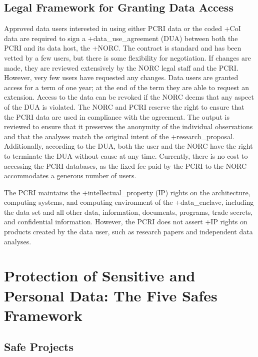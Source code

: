 \documentclass[
]{book}
\begin{document}
\hypertarget{legal-framework-for-granting-data-access-3}{%
\subsection{Legal Framework for Granting Data Access}\label{legal-framework-for-granting-data-access-3}}

Approved data users interested in using either PCRI data or the coded +CoI\textbar{} data are required to sign a +data\_use\_agreement\textbar{} (DUA) between both the PCRI and its data host, the +NORC\textbar. The contract is standard and has been vetted by a few users, but there is some flexibility for negotiation. If changes are made, they are reviewed extensively by the NORC legal staff and the PCRI. However, very few users have requested any changes. Data users are granted access for a term of one year; at the end of the term they are able to request an extension. Access to the data can be revoked if the NORC deems that any aspect of the DUA is violated. The NORC and PCRI reserve the right to ensure that the PCRI data are used in compliance with the agreement. The output is reviewed to ensure that it preserves the anonymity of the individual observations and that the analyses match the original intent of the +research\_proposal\textbar. Additionally, according to the DUA, both the user and the NORC have the right to terminate the DUA without cause at any time. Currently, there is no cost to accessing the PCRI databases, as the fixed fee paid by the PCRI to the NORC accommodates a generous number of users.

The PCRI maintains the +intellectual\_property\textbar{} (IP) rights on the architecture, computing systems, and computing environment of the +data\_enclave\textbar, including the data set and all other data, information, documents, programs, trade secrets, and confidential information. However, the PCRI does not assert +IP\textbar{} rights on products created by the data user, such as research papers and independent data analyses.

\hypertarget{protection-of-sensitive-and-personal-data-the-five-safes-framework-3}{%
\section{Protection of Sensitive and Personal Data: The Five Safes Framework}\label{protection-of-sensitive-and-personal-data-the-five-safes-framework-3}}

\hypertarget{safe-projects-3}{%
\subsection{Safe Projects}\label{safe-projects-3}}
\end{document}
